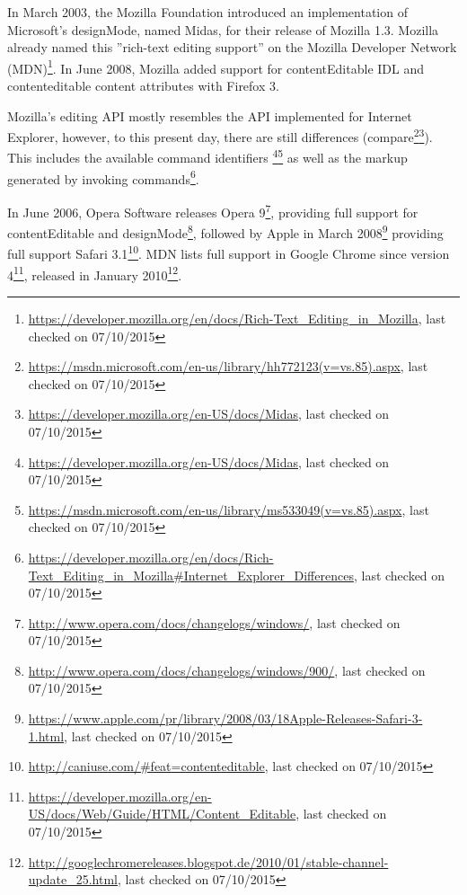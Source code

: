 
In March 2003, the Mozilla Foundation introduced an implementation of Microsoft's designMode, named Midas, for their release of Mozilla 1.3. Mozilla already named this ''rich-text editing support'' on the Mozilla Developer Network (MDN)\footnote{\url{https://developer.mozilla.org/en/docs/Rich-Text\_Editing\_in\_Mozilla}, last checked on 07/10/2015}. In June 2008, Mozilla added support for contentEditable IDL and contenteditable content attributes with Firefox 3. 

Mozilla's editing API mostly resembles the API implemented for Internet Explorer, however, to this present day, there are still differences (compare\footnote{\url{https://msdn.microsoft.com/en-us/library/hh772123(v=vs.85).aspx}, last checked on 07/10/2015}\footnote{\url{https://developer.mozilla.org/en-US/docs/Midas}, last checked on 07/10/2015}). This includes the available command identifiers \footnote{\url{https://developer.mozilla.org/en-US/docs/Midas}, last checked on 07/10/2015}\footnote{\url{https://msdn.microsoft.com/en-us/library/ms533049(v=vs.85).aspx}, last checked on 07/10/2015} as well as the markup generated by invoking commands\footnote{\url{https://developer.mozilla.org/en/docs/Rich-Text\_Editing\_in\_Mozilla#Internet\_Explorer\_Differences}, last checked on 07/10/2015}. 



In June 2006, Opera Software releases Opera 9\footnote{\url{http://www.opera.com/docs/changelogs/windows/}, last checked on 07/10/2015}, providing full support for contentEditable and designMode\footnote{\url{http://www.opera.com/docs/changelogs/windows/900/}, last checked on 07/10/2015}, followed by Apple in March 2008\footnote{\url{https://www.apple.com/pr/library/2008/03/18Apple-Releases-Safari-3-1.html}, last checked on 07/10/2015} providing full support Safari 3.1\footnote{\url{http://caniuse.com/#feat=contenteditable}, last checked on 07/10/2015}. MDN lists full support in Google Chrome since version 4\footnote{\url{https://developer.mozilla.org/en-US/docs/Web/Guide/HTML/Content\_Editable}, last checked on 07/10/2015}, released in January 2010\footnote{\url{http://googlechromereleases.blogspot.de/2010/01/stable-channel-update\_25.html}, last checked on 07/10/2015}.

